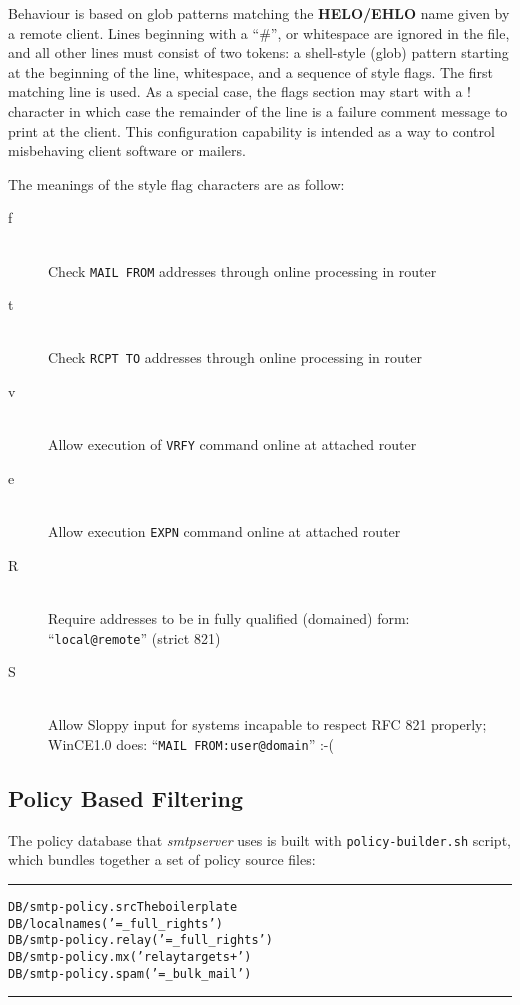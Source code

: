 Behaviour is based on glob patterns matching the {\bf HELO/EHLO} name
given by a remote client.
Lines beginning with a ``\#'', or whitespace are ignored in the file,
and all other lines must consist of two tokens: a shell-style (glob) 
pattern starting at the beginning of the line, whitespace, and a 
sequence of style flags. The first matching line is used. As a 
special case, the flags section may start with a ! character in 
which case the remainder of the line is a failure comment message 
to print at the client. This configuration capability is intended 
as a way to control misbehaving client software or mailers.

The meanings of the style flag characters are as follow:
\begin{description}
\item[f]\mbox{}\\
Check {\tt MAIL FROM} addresses through online processing in router
\item[t]\mbox{}\\
Check {\tt RCPT TO} addresses through online processing in router
\item[v]\mbox{}\\
Allow execution of {\tt VRFY} command online at attached router
\item[e]\mbox{}\\
Allow execution {\tt EXPN} command online at attached router
\item[R]\mbox{}\\
Require addresses to be in fully qualified (domained) form:
``{\tt local@remote}'' (strict 821)
\item[S]\mbox{}\\
Allow Sloppy input for systems incapable to respect RFC 821
properly; WinCE1.0 does: ``{\tt MAIL FROM:user@domain}'' :-(
\end{description}





\subsection{Policy Based Filtering}
\label{adm:smtp_policy_filtering}


The policy database that {\em smtpserver} uses is built with
{\tt policy-builder.sh} script, which bundles together a set
of policy source files:

\begin{alltt}\medskip\hrule\small\medskip
DB/smtp-policy.src   The boilerplate
DB/localnames        ('= _full_rights')
DB/smtp-policy.relay ('= _full_rights')
DB/smtp-policy.mx    ('relaytargets +')
DB/smtp-policy.spam  ('= _bulk_mail')
\medskip\hrule\end{alltt}\medskip


